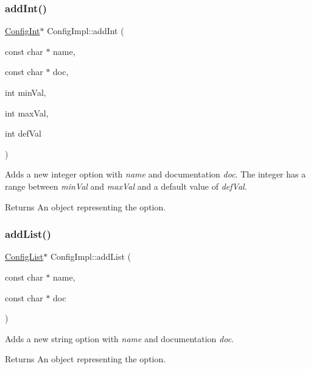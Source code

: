 \subsubsection{\texorpdfstring{addInt()}{addInt()}}
{\footnotesize\ttfamily \mbox{\hyperlink{class_config_int}{Config\+Int}}$\ast$ Config\+Impl\+::add\+Int (\begin{DoxyParamCaption}\item[{const char $\ast$}]{name,  }\item[{const char $\ast$}]{doc,  }\item[{int}]{min\+Val,  }\item[{int}]{max\+Val,  }\item[{int}]{def\+Val }\end{DoxyParamCaption})\hspace{0.3cm}{\ttfamily [inline]}}

Adds a new integer option with {\itshape name} and documentation {\itshape doc}. The integer has a range between {\itshape min\+Val} and {\itshape max\+Val} and a default value of {\itshape def\+Val}. \begin{DoxyReturn}{Returns}
An object representing the option. 
\end{DoxyReturn}
\mbox{\label{class_config_impl_a9b4b476dc6a6c4e5e1f54b63dbd20d13}} 
\subsubsection{\texorpdfstring{addList()}{addList()}}
{\footnotesize\ttfamily \mbox{\hyperlink{class_config_list}{Config\+List}}$\ast$ Config\+Impl\+::add\+List (\begin{DoxyParamCaption}\item[{const char $\ast$}]{name,  }\item[{const char $\ast$}]{doc }\end{DoxyParamCaption})\hspace{0.3cm}{\ttfamily [inline]}}

Adds a new string option with {\itshape name} and documentation {\itshape doc}. \begin{DoxyReturn}{Returns}
An object representing the option. 
\end{DoxyReturn}
\mbox{\label{class_config_impl_a68405127d051b129bb0c3ac43bc238dc}} 
